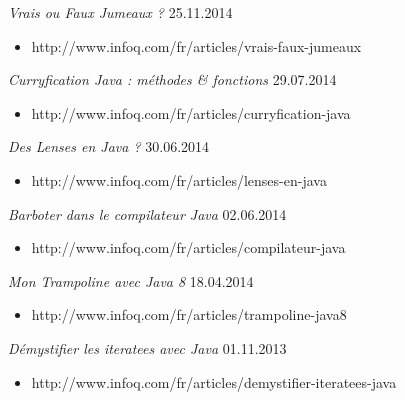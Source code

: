 \documentclass{res}
\begin{document}
\begin{resume}
{\sl Vrais ou Faux Jumeaux ?}  \hfill    25.11.2014 \\
\vspace{-5mm}
\begin{itemize}
\item[]  \scriptsize http://www.infoq.com/fr/articles/vrais-faux-jumeaux
\end{itemize}
\vspace{-2mm}

{\sl Curryfication Java : méthodes \& fonctions}  \hfill    29.07.2014 \\
\vspace{-5mm}
\begin{itemize} %
 \item[] \scriptsize http://www.infoq.com/fr/articles/curryfication-java
\end{itemize}
\vspace{-2mm}


{\sl Des Lenses en Java ?}  \hfill    30.06.2014	\\
\vspace{-5mm}
\begin{itemize}
 \item[]  \scriptsize http://www.infoq.com/fr/articles/lenses-en-java
\end{itemize}
\vspace{-2mm}

{\sl Barboter dans le compilateur Java}  \hfill    02.06.2014	\\
\vspace{-5mm}
\begin{itemize}
 \item[]  \scriptsize http://www.infoq.com/fr/articles/compilateur-java
\end{itemize}
\vspace{-2mm}

{\sl Mon Trampoline avec Java 8}  \hfill    18.04.2014	\\
\vspace{-5mm}
\begin{itemize}
 \item[]  \scriptsize http://www.infoq.com/fr/articles/trampoline-java8
\end{itemize}
\vspace{-2mm}

{\sl Démystifier les iteratees avec Java}  \hfill    01.11.2013	\\
\vspace{-5mm}
\begin{itemize}
 \item[]  \scriptsize http://www.infoq.com/fr/articles/demystifier-iteratees-java
\end{itemize}
\vspace{-2mm}


\end{resume}
\end{document}
